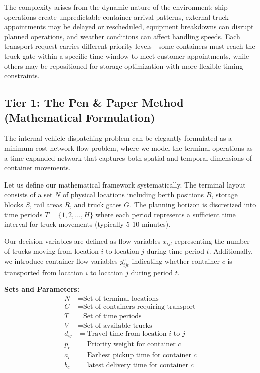 \documentclass{article}
\begin{document}
The complexity arises from the dynamic nature of the environment: ship operations create unpredictable container arrival patterns, external truck appointments may be delayed or rescheduled, equipment breakdowns can disrupt planned operations, and weather conditions can affect handling speeds. Each transport request carries different priority levels - some containers must reach the truck gate within a specific time window to meet customer appointments, while others may be repositioned for storage optimization with more flexible timing constraints.

\subsection{Tier 1: The Pen \& Paper Method (Mathematical Formulation)}

The internal vehicle dispatching problem can be elegantly formulated as a minimum cost network flow problem, where we model the terminal operations as a time-expanded network that captures both spatial and temporal dimensions of container movements.

Let us define our mathematical framework systematically. The terminal layout consists of a set $N$ of physical locations including berth positions $B$, storage blocks $S$, rail areas $R$, and truck gates $G$. The planning horizon is discretized into time periods $T = \{1, 2, \ldots, H\}$ where each period represents a sufficient time interval for truck movements (typically 5-10 minutes).

Our decision variables are defined as flow variables $x_{ijt}$ representing the number of trucks moving from location $i$ to location $j$ during time period $t$. Additionally, we introduce container flow variables $y_{ijt}^c$ indicating whether container $c$ is transported from location $i$ to location $j$ during period $t$.

\textbf{Sets and Parameters:}
\begin{align}
N &= \text{Set of terminal locations} \\
C &= \text{Set of containers requiring transport} \\
T &= \text{Set of time periods} \\
V &= \text{Set of available trucks} \\
d_{ij} &= \text{Travel time from location } i \text{ to } j \\
p_c &= \text{Priority weight for container } c \\
a_c &= \text{Earliest pickup time for container } c \\
b_c &= \text{latest delivery time for container } c
\end{align}
\end{document}
